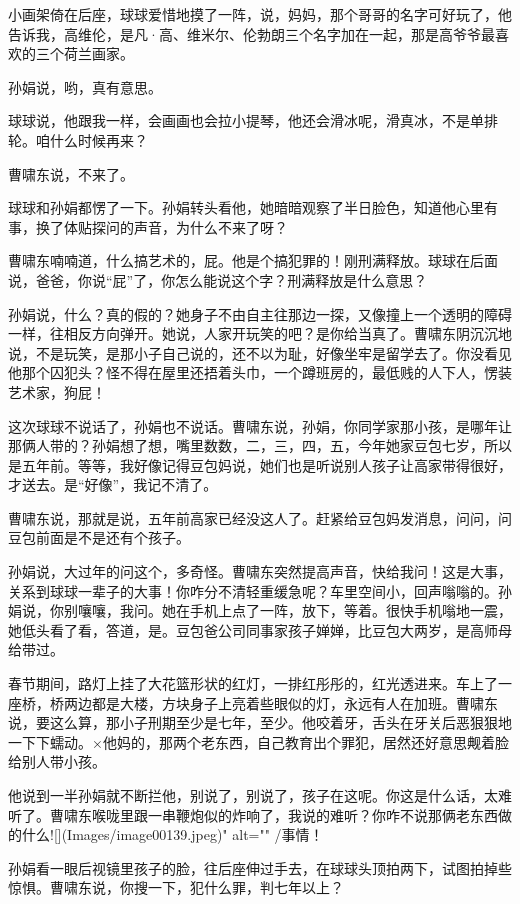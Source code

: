 \documentclass[lang=cn,newtx,12pt,scheme=chinese]{elegantbook}
\begin{document}
小画架倚在后座，球球爱惜地摸了一阵，说，妈妈，那个哥哥的名字可好玩了，他告诉我，高维伦，是凡·高、维米尔、伦勃朗三个名字加在一起，那是高爷爷最喜欢的三个荷兰画家。

孙娟说，哟，真有意思。

球球说，他跟我一样，会画画也会拉小提琴，他还会滑冰呢，滑真冰，不是单排轮。咱什么时候再来？

曹啸东说，不来了。

球球和孙娟都愣了一下。孙娟转头看他，她暗暗观察了半日脸色，知道他心里有事，换了体贴探问的声音，为什么不来了呀？

曹啸东喃喃道，什么搞艺术的，屁。他是个搞犯罪的！刚刑满释放。球球在后面说，爸爸，你说“屁”了，你怎么能说这个字？刑满释放是什么意思？

孙娟说，什么？真的假的？她身子不由自主往那边一探，又像撞上一个透明的障碍一样，往相反方向弹开。她说，人家开玩笑的吧？是你给当真了。曹啸东阴沉沉地说，不是玩笑，是那小子自己说的，还不以为耻，好像坐牢是留学去了。你没看见他那个囚犯头？怪不得在屋里还捂着头巾，一个蹲班房的，最低贱的人下人，愣装艺术家，狗屁！

这次球球不说话了，孙娟也不说话。曹啸东说，孙娟，你同学家那小孩，是哪年让那俩人带的？孙娟想了想，嘴里数数，二，三，四，五，今年她家豆包七岁，所以是五年前。等等，我好像记得豆包妈说，她们也是听说别人孩子让高家带得很好，才送去。是“好像”，我记不清了。

曹啸东说，那就是说，五年前高家已经没这人了。赶紧给豆包妈发消息，问问，问豆包前面是不是还有个孩子。

孙娟说，大过年的问这个，多奇怪。曹啸东突然提高声音，快给我问！这是大事，关系到球球一辈子的大事！你咋分不清轻重缓急呢？车里空间小，回声嗡嗡的。孙娟说，你别嚷嚷，我问。她在手机上点了一阵，放下，等着。很快手机嗡地一震，她低头看了看，答道，是。豆包爸公司同事家孩子婵婵，比豆包大两岁，是高师母给带过。

春节期间，路灯上挂了大花篮形状的红灯，一排红彤彤的，红光透进来。车上了一座桥，桥两边都是大楼，方块身子上亮着些眼似的灯，永远有人在加班。曹啸东说，要这么算，那小子刑期至少是七年，至少。他咬着牙，舌头在牙关后恶狠狠地一下下蠕动。×他妈的，那两个老东西，自己教育出个罪犯，居然还好意思觍着脸给别人带小孩。

他说到一半孙娟就不断拦他，别说了，别说了，孩子在这呢。你这是什么话，太难听了。曹啸东喉咙里跟一串鞭炮似的炸响了，我说的难听？你咋不说那俩老东西做的什么![](Images/image00139.jpeg)" alt="" /\>事情！

孙娟看一眼后视镜里孩子的脸，往后座伸过手去，在球球头顶拍两下，试图拍掉些惊惧。曹啸东说，你搜一下，犯什么罪，判七年以上？
\end{document}
